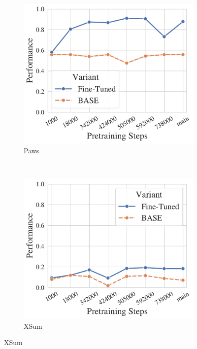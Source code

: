 \begin{figure}[t!]
\begin{subfigure}[b]{0.3\textwidth}
    \end{subfigure}%
    ~ 
    \begin{subfigure}[b]{0.3\textwidth}
    \includegraphics[width=\the\columnwidth]{figures/fig_files/ft_ckpts/sft_evalpaws-trainpaws.pdf}
        \caption{Paws}
    \end{subfigure}%
    \\
    \begin{subfigure}[b]{0.3\textwidth}
    \includegraphics[width=\the\columnwidth]{figures/fig_files/ft_ckpts/sft_evalxsum-trainxsum.pdf}
        \caption{XSum}

\end{subfigure}
\end{figure}
